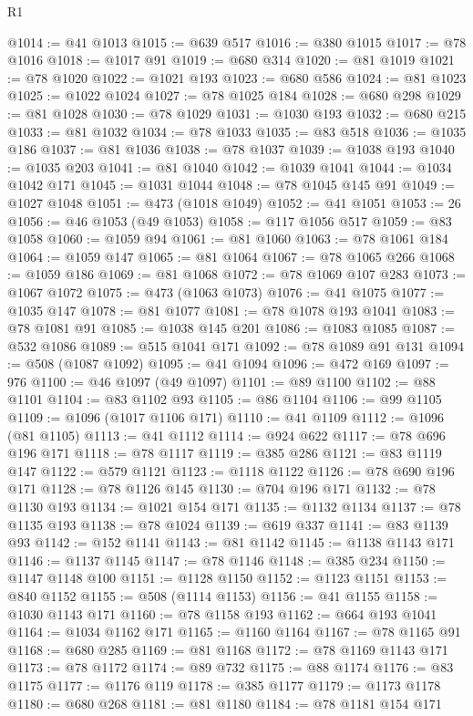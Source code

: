 \begin{lexlean}{R1}
\begin{coremodule}
@1014 := @41 @1013
@1015 := @639 @517
@1016 := @380 @1015
@1017 := @78 @1016
@1018 := @1017 @91
@1019 := @680 @314
@1020 := @81 @1019
@1021 := @78 @1020
@1022 := @1021 @193
@1023 := @680 @586
@1024 := @81 @1023
@1025 := @1022 @1024
@1027 := @78 @1025 @184
@1028 := @680 @298
@1029 := @81 @1028
@1030 := @78 @1029
@1031 := @1030 @193
@1032 := @680 @215
@1033 := @81 @1032
@1034 := @78 @1033
@1035 := @83 @518
@1036 := @1035 @186
@1037 := @81 @1036
@1038 := @78 @1037
@1039 := @1038 @193
@1040 := @1035 @203
@1041 := @81 @1040
@1042 := @1039 @1041
@1044 := @1034 @1042 @171
@1045 := @1031 @1044
@1048 := @78 @1045 @145 @91
@1049 := @1027 @1048
@1051 := @473 (@1018 @1049)
@1052 := @41 @1051
@1053 := 26
@1056 := @46 @1053 (@49 @1053)
@1058 := @117 @1056 @517
@1059 := @83 @1058
@1060 := @1059 @94
@1061 := @81 @1060
@1063 := @78 @1061 @184
@1064 := @1059 @147
@1065 := @81 @1064
@1067 := @78 @1065 @266
@1068 := @1059 @186
@1069 := @81 @1068
@1072 := @78 @1069 @107 @283
@1073 := @1067 @1072
@1075 := @473 (@1063 @1073)
@1076 := @41 @1075
@1077 := @1035 @147
@1078 := @81 @1077
@1081 := @78 @1078 @193 @1041
@1083 := @78 @1081 @91
@1085 := @1038 @145 @201
@1086 := @1083 @1085
@1087 := @532 @1086
@1089 := @515 @1041 @171
@1092 := @78 @1089 @91 @131
@1094 := @508 (@1087 @1092)
@1095 := @41 @1094
@1096 := @472 @169
@1097 := 976
@1100 := @46 @1097 (@49 @1097)
@1101 := @89 @1100
@1102 := @88 @1101
@1104 := @83 @1102 @93
@1105 := @86 @1104
@1106 := @99 @1105
@1109 := @1096 (@1017 @1106 @171)
@1110 := @41 @1109
@1112 := @1096 (@81 @1105)
@1113 := @41 @1112
@1114 := @924 @622
@1117 := @78 @696 @196 @171
@1118 := @78 @1117
@1119 := @385 @286
@1121 := @83 @1119 @147
@1122 := @579 @1121
@1123 := @1118 @1122
@1126 := @78 @690 @196 @171
@1128 := @78 @1126 @145
@1130 := @704 @196 @171
@1132 := @78 @1130 @193
@1134 := @1021 @154 @171
@1135 := @1132 @1134
@1137 := @78 @1135 @193
@1138 := @78 @1024
@1139 := @619 @337
@1141 := @83 @1139 @93
@1142 := @152 @1141
@1143 := @81 @1142
@1145 := @1138 @1143 @171
@1146 := @1137 @1145
@1147 := @78 @1146
@1148 := @385 @234
@1150 := @1147 @1148 @100
@1151 := @1128 @1150
@1152 := @1123 @1151
@1153 := @840 @1152
@1155 := @508 (@1114 @1153)
@1156 := @41 @1155
@1158 := @1030 @1143 @171
@1160 := @78 @1158 @193
@1162 := @664 @193 @1041
@1164 := @1034 @1162 @171
@1165 := @1160 @1164
@1167 := @78 @1165 @91
@1168 := @680 @285
@1169 := @81 @1168
@1172 := @78 @1169 @1143 @171
@1173 := @78 @1172
@1174 := @89 @732
@1175 := @88 @1174
@1176 := @83 @1175
@1177 := @1176 @119
@1178 := @385 @1177
@1179 := @1173 @1178
@1180 := @680 @268
@1181 := @81 @1180
@1184 := @78 @1181 @154 @171

\end{coremodule}
\end{lexlean}
